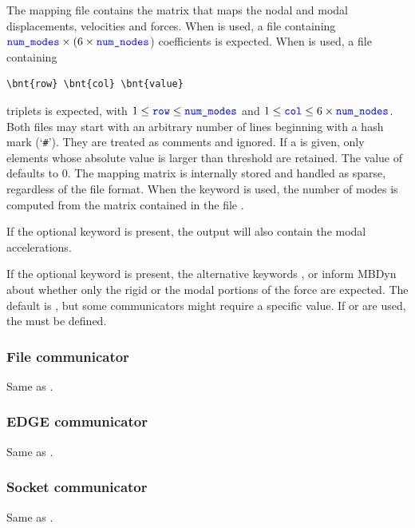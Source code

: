 The mapping file contains the matrix that maps the nodal and modal
displacements, velocities and forces.
When  is used, a file containing
$\textcolor{blue}{\texttt{num\_modes}} \times (6\times\textcolor{blue}{\texttt{num\_nodes}}$) coefficients is expected.
When  is used, a file containing
\begin{Verbatim}[commandchars=\\\{\}]
\bnt{row} \bnt{col} \bnt{value}
\end{Verbatim}
triplets is expected, with $1 \le \textcolor{blue}{\texttt{row}} \le \textcolor{blue}{\texttt{num\_modes}}$
and $1 \le \textcolor{blue}{\texttt{col}} \le 6\times\textcolor{blue}{\texttt{num\_nodes}}$.
Both files may start with an arbitrary number of lines beginning
with a hash mark (`\texttt{\#}').
They are treated as comments and ignored.
If a  is given, only elements whose absolute value
is larger than threshold are retained.
The value of  defaults to 0.
The mapping matrix is internally stored and handled as sparse,
regardless of the file format.
When the keyword  is used, the number of modes 
is computed from the matrix contained in the file .

If the optional keyword  is present,
the output will also contain the modal accelerations.

If the optional keyword  is present,
the alternative keywords ,  or 
inform MBDyn about whether only the rigid or the modal portions
of the force are expected.
The default is , but some communicators might require
a specific value.
If  or  are used, the  must be defined.



\subsubsection{File communicator}
Same as .

\subsubsection{EDGE communicator}
Same as .

\subsubsection{Socket communicator}
Same as .




